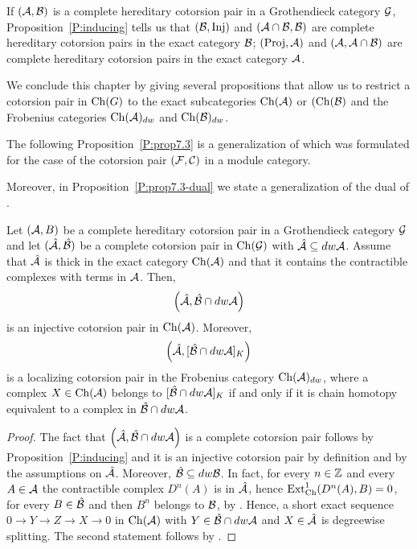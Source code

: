 %
%
%

\begin{rem}\label{R:induced} If $(\mathcal{A}, \mathcal{B})$ is a complete hereditary cotorsion pair in a Grothendieck category $\mathcal{G}$, Proposition~\ref{P:inducing} tells us that $(\mathcal{B}, \mathrm{Inj})$ and $(\mathcal{A}\cap \mathcal{B}, \mathcal{B})$  are complete hereditary cotorsion pairs in the exact category $\mathcal{B}$; $(\mathrm{Proj}, \mathcal{A})$ and $(\mathcal{A}, \mathcal{A}\cap \mathcal{B})$ are complete hereditary cotorsion pairs  in the exact category $\mathcal{A}$.
\end{rem}


%

We conclude this chapter by giving several propositions that allow us to restrict a cotorsion pair in $\mathrm{Ch}(G)$ to the exact subcategories $\mathrm{Ch}(\mathcal{A})$ or $(\mathrm{Ch}(\mathcal{B})$ and the Frobenius categories $\mathrm{Ch}(\mathcal{A})_{dw}$ and $\mathrm{Ch}(\mathcal{B})_{dw}$.

 The following Proposition~\ref{P:prop7.3} is a generalization of \cite[Proposition 7.3]{G7} which was formulated for the case of the cotorsion pair $(\mathcal{F}, \mathcal{C})$ in a module category. %

Moreover, in Proposition~\ref{P:prop7.3-dual} we state a generalization of the dual of \cite[Proposition 7.3]{G7}.
%


\begin{prop}\label{P:prop7.3} Let $(\mathcal{A}, B)$ be a complete hereditary cotorsion pair in a Grothendieck category $\mathcal{G}$ and let $(\hat{\mathcal{A}}, \hat{\mathcal{B}})$ be a complete cotorsion pair in $\mathrm{Ch}(\mathcal{G})$ with $\hat{\mathcal{A}}\subseteq dw\mathcal{A}$. Assume that $\hat{\mathcal{A}}$ is thick in the exact category $\mathrm{Ch}(\mathcal{A})$ and that it contains the contractible complexes with terms in $\mathcal{A}$.
Then, \[\Big(\hat{\mathcal{A}}, \hat{\mathcal{B}}\cap dw \mathcal{A}\Big)\] is an injective cotorsion pair in $\mathrm{Ch}(\mathcal{A})$.
Moreover,  \[\Big(\hat{\mathcal{A}}, [\hat{\mathcal{B}}\cap dw \mathcal{A}]_K\Big)\] is a localizing cotorsion pair in the Frobenius category $\mathrm{Ch}(\mathcal{A})_{dw}$, where a complex $X\in \mathrm{Ch}(\mathcal{A})$ belongs to $[\hat{\mathcal{B}}\cap dw \mathcal{A}]_K$ if and only if it is chain homotopy equivalent to a complex in $\hat{\mathcal{B}}\cap dw \mathcal{A}$.
\end{prop}
%
\begin{proof}
  \begin{sloppypar}
  The fact that $\Big(\hat{\mathcal{A}}, \hat{\mathcal{B}}\cap dw \mathcal{A}\Big)$ is a complete cotorsion pair follows by Proposition~\ref{P:inducing} and it is an injective cotorsion pair by definition and by the assumptions on $\hat{\mathcal{A}}$. Moreover, ${\hat{\mathcal{B}}\subseteq dw \mathcal{B}}$. In fact, for every $n\in \mathbb{Z}$ and every  $A\in \mathcal{A}$  the contractible complex $D^n(A)$ is in $\hat{\mathcal{A}}$, hence $\operatorname{Ext}^1_{\mathrm{Ch}}(D^n(A),  B)=0$, for every $B\in\hat{\mathcal{B}}$ and then $B^n$ belongs to $\mathcal{B}$, by \cite[Lemma 3.1]{G1}. Hence, a short exact sequence $0\to Y\to Z\to X\to 0$ in $\mathrm{Ch}(\mathcal{A})$ with $Y\in\hat{\mathcal{B}}\cap dw \mathcal{A}$ and $X\in \hat{\mathcal{A}}$ is degreewise splitting. The second statement follows by \cite[Theorem 6.3, Proposition 6.4]{G7}.
\end{sloppypar}
\end{proof}
%

